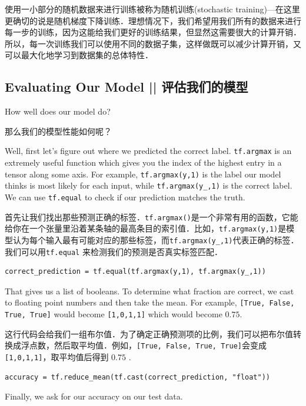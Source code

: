 使用一小部分的随机数据来进行训练被称为随机训练(stochastic training)---在这里更确切的说是随机梯度下降训练．理想情况下，我们希望用我们所有的数据来进行每一步的训练，因为这能给我们更好的训练结果，但显然这需要很大的计算开销．所以，每一次训练我们可以使用不同的数据子集，这样做既可以减少计算开销，又可以最大化地学习到数据集的总体特性．

\subsection{Evaluating Our Model   ||   评估我们的模型}

How well does our model do?

那么我们的模型性能如何呢？

Well, first let's figure out where we predicted the correct label. \lstinline{tf.argmax} is an extremely useful function which gives you the index of the highest entry in a tensor along some axis. For example, \lstinline{tf.argmax(y,1)} is the label our model thinks is most likely for each input, while \lstinline{tf.argmax(y_,1)} is the correct label. We can use \lstinline{tf.equal} to check if our prediction matches the truth.

首先让我们找出那些预测正确的标签．\lstinline{tf.argmax()}是一个非常有用的函数，它能给你在一个张量里沿着某条轴的最高条目的索引值．比如，\lstinline{tf.argmax(y,1)}是模型认为每个输入最有可能对应的那些标签，而\lstinline{tf.argmax(y_,1)}代表正确的标签．我们可以用\lstinline{tf.equal} 来检测我们的预测是否真实标签匹配．

\begin{lstlisting}
correct_prediction = tf.equal(tf.argmax(y,1), tf.argmax(y_,1))
\end{lstlisting}

That gives us a list of booleans. To determine what fraction are correct, we cast to floating point numbers and then take the mean. For example, \lstinline{[True, False, True, True]} would become \lstinline{[1,0,1,1]} which would become $0.75$.

这行代码会给我们一组布尔值．为了确定正确预测项的比例，我们可以把布尔值转换成浮点数，然后取平均值．例如，\lstinline{[True, False, True, True]}会变成\lstinline{[1,0,1,1]}，取平均值后得到 $0.75$ .

\begin{lstlisting}
accuracy = tf.reduce_mean(tf.cast(correct_prediction, "float"))
\end{lstlisting}

Finally, we ask for our accuracy on our test data.

